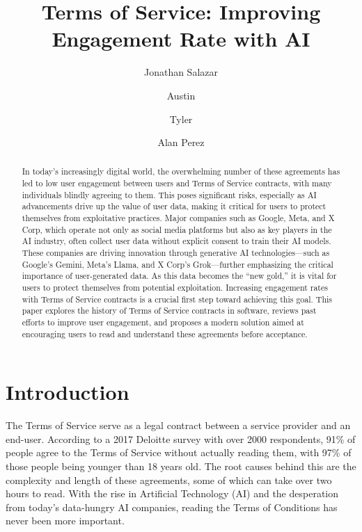 \documentclass[sigconf, nonacm]{acmart}
\begin{document}
\title{Terms of Service: Improving Engagement Rate with AI}

\author{Jonathan Salazar}

\author{Austin}
\author{Tyler}
\author{Alan Perez}

\begin{abstract}
In today's increasingly digital world, the overwhelming number of these agreements has led to low user engagement between users and Terms of Service contracts, with many individuals blindly agreeing to them. This poses significant risks, especially as AI advancements drive up the value of user data, making it critical for users to protect themselves from exploitative practices. Major companies such as Google, Meta, and X Corp, which operate not only as social media platforms but also as key players in the AI industry, often collect user data without explicit consent to train their AI models. These companies are driving innovation through generative AI technologies—such as Google’s Gemini, Meta’s Llama, and X Corp’s Grok—further emphasizing the critical importance of user-generated data. As this data becomes the “new gold,” it is vital for users to protect themselves from potential exploitation. Increasing engagement rates with Terms of Service contracts is a crucial first step toward achieving this goal.  This paper explores the history of Terms of Service contracts in software, reviews past efforts to improve user engagement, and proposes a modern solution aimed at encouraging users to read and understand these agreements before acceptance.
\end{abstract}

\maketitle

\section{Introduction}
The Terms of Service serve as a legal contract between a service provider and an end-user. According to a 2017 Deloitte survey with over 2000 respondents, 91\% of people agree to the Terms of Service without actually reading them, with 97\% of those people being younger than 18 years old. The root causes behind this are the complexity and length of these agreements, some of which can take over two hours to read. With the rise in Artificial Technology (AI) and the desperation from today's data-hungry AI companies, reading the Terms of Conditions has never been more important.
\end{document}
